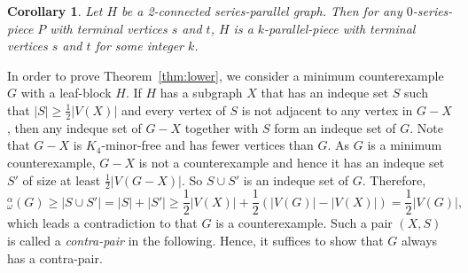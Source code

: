 \documentclass{article}
\newtheorem{cor}[thm]{Corollary}
\newcommand{\idq}{{}^{\alpha}_{\omega}}
\begin{document}
\begin{cor}\label{cor:terminal}
Let $H$ be a 2-connected series-parallel graph. Then for any $0$-series-piece $P$ with terminal vertices $s$ and $t$, $H$ is a $k$-parallel-piece with terminal vertices $s$ and $t$ for some integer $k$. 
\end{cor}



In order to prove Theorem~\ref{thm:lower}, we consider a minimum counterexample $G$ with a leaf-block $H$. If $H$ has a subgraph $X$ that has an indeque set $S$ such that  $|S|\ge \frac 1 2 |V(X)|$ and every vertex of $S$ is not adjacent to any vertex in $G-X$, then any indeque set of $G-X$ together with $S$ form an indeque set of $G$. Note that $G-X$ is $K_4$-minor-free and has fewer vertices than $G$. As $G$ is a minimum counterexample, $G-X$ is not a counterexample and hence it has an indeque set $S'$ of size at least $\frac 1 2 |V(G-X)|$. So $S\cup S'$ is an indeque set of $G$. Therefore,
\[\idq(G)\ge |S\cup S'|=|S|+|S'|\ge \frac 1 2 |V(X)|+\frac 1 2 (|V(G)|-|V(X)|)=\frac 1 2 |V(G)|,\]
which leads a contradiction to that $G$ is a counterexample. Such a pair $(X, S)$ is called a {\em contra-pair} in the following. Hence, it suffices to show that $G$ always has a contra-pair.  
\end{document}
